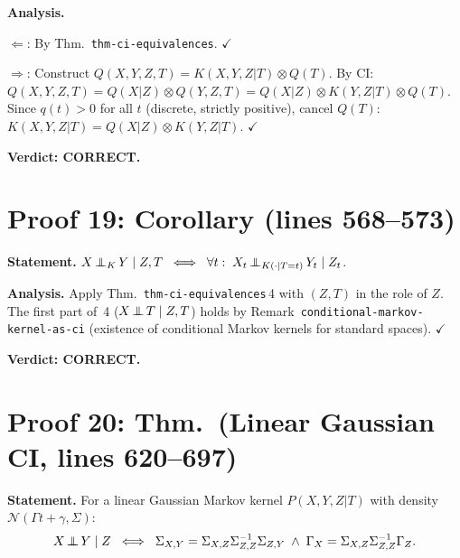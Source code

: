 \documentclass{article}
\begin{document}
\textbf{Analysis.}

$\Leftarrow$: By Thm.~\texttt{thm-ci-equivalences}.  $\checkmark$

$\Rightarrow$: Construct $Q(X,Y,Z,T)=K(X,Y,Z|T)\otimes Q(T)$.
By CI: $Q(X,Y,Z,T)=Q(X|Z)\otimes Q(Y,Z,T)=Q(X|Z)\otimes K(Y,Z|T)\otimes Q(T)$.
Since $q(t)>0$ for all $t$ (discrete, strictly positive), cancel $Q(T)$:
$K(X,Y,Z|T)=Q(X|Z)\otimes K(Y,Z|T)$.  $\checkmark$

\textbf{Verdict: CORRECT.}

\section{Proof 19: Corollary (lines 568--573)}

\textbf{Statement.}
$X\operatorname*{\perp\mkern-11mu\perp}_K Y\mid Z,T \;\iff\; \forall t:\; X_t\operatorname*{\perp\mkern-11mu\perp}_{K(\cdot|T=t)} Y_t\mid Z_t$.

\textbf{Analysis.}
Apply Thm.~\texttt{thm-ci-equivalences}\,4 with $(Z,T)$ in the role of $Z$.
The first part of~4 ($X\operatorname*{\perp\mkern-11mu\perp} T\mid Z,T$) holds by
Remark~\texttt{conditional-markov-kernel-as-ci} (existence of conditional
Markov kernels for standard spaces).  $\checkmark$

\textbf{Verdict: CORRECT.}

\section{Proof 20: Thm.\ (Linear Gaussian CI, lines 620--697)}

\textbf{Statement.} For a linear Gaussian Markov kernel $P(X,Y,Z|T)$ with
density $\mathcal{N}(\Gamma t+\gamma,\Sigma)$:
\[X\operatorname*{\perp\mkern-11mu\perp} Y\mid Z \;\iff\;
  \Sigma_{X,Y}=\Sigma_{X,Z}\Sigma_{Z,Z}^{-1}\Sigma_{Z,Y}
  \;\land\; \Gamma_X=\Sigma_{X,Z}\Sigma_{Z,Z}^{-1}\Gamma_Z.\]
\end{document}
